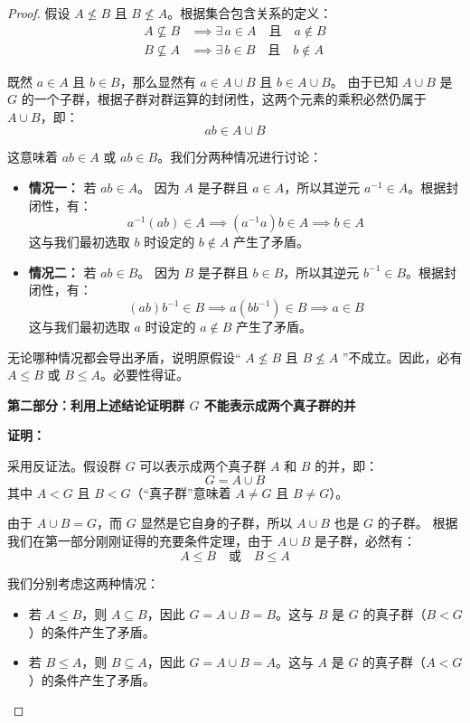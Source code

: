 \documentclass[]{article}
\begin{document}
\begin{proof}
假设 $A \not\leqslant B$ 且 $B \not\leqslant A$。根据集合包含关系的定义：
\begin{align*}
	A \not\subseteq B &\implies \exists \, a \in A \quad \text{且} \quad a \notin B \\
	B \not\subseteq A &\implies \exists \, b \in B \quad \text{且} \quad b \notin A
\end{align*}

既然 $a \in A$ 且 $b \in B$，那么显然有 $a \in A \cup B$ 且 $b \in A \cup B$。
由于已知 $A \cup B$ 是 $G$ 的一个子群，根据子群对群运算的封闭性，这两个元素的乘积必然仍属于 $A \cup B$，即：
\[ ab \in A \cup B \]

这意味着 $ab \in A$ 或 $ab \in B$。我们分两种情况进行讨论：
\begin{itemize}
	\item \textbf{情况一：} 若 $ab \in A$。
	因为 $A$ 是子群且 $a \in A$，所以其逆元 $a^{-1} \in A$。根据封闭性，有：
	\[ a^{-1}(ab) \in A \implies (a^{-1}a)b \in A \implies b \in A \]
	这与我们最初选取 $b$ 时设定的 $b \notin A$ 产生了矛盾。
	
	\item \textbf{情况二：} 若 $ab \in B$。
	因为 $B$ 是子群且 $b \in B$，所以其逆元 $b^{-1} \in B$。根据封闭性，有：
	\[ (ab)b^{-1} \in B \implies a(bb^{-1}) \in B \implies a \in B \]
	这与我们最初选取 $a$ 时设定的 $a \notin B$ 产生了矛盾。
\end{itemize}

无论哪种情况都会导出矛盾，说明原假设“ $A \not\leqslant B$ 且 $B \not\leqslant A$ ”不成立。因此，必有 $A \leqslant B$ 或 $B \leqslant A$。必要性得证。

\bigskip
\noindent \textbf{第二部分：利用上述结论证明群 $G$ 不能表示成两个真子群的并}

\medskip
\noindent \textbf{证明：}

采用反证法。假设群 $G$ 可以表示成两个真子群 $A$ 和 $B$ 的并，即：
\[ G = A \cup B \]
其中 $A < G$ 且 $B < G$（“真子群”意味着 $A \neq G$ 且 $B \neq G$）。

由于 $A \cup B = G$，而 $G$ 显然是它自身的子群，所以 $A \cup B$ 也是 $G$ 的子群。
根据我们在第一部分刚刚证得的充要条件定理，由于 $A \cup B$ 是子群，必然有：
\[ A \leqslant B \quad \text{或} \quad B \leqslant A \]

我们分别考虑这两种情况：
\begin{itemize}
	\item 若 $A \leqslant B$，则 $A \subseteq B$，因此 $G = A \cup B = B$。这与 $B$ 是 $G$ 的真子群（$B < G$）的条件产生了矛盾。
	\item 若 $B \leqslant A$，则 $B \subseteq A$，因此 $G = A \cup B = A$。这与 $A$ 是 $G$ 的真子群（$A < G$）的条件产生了矛盾。
\end{itemize}


\end{proof}
\end{document}
